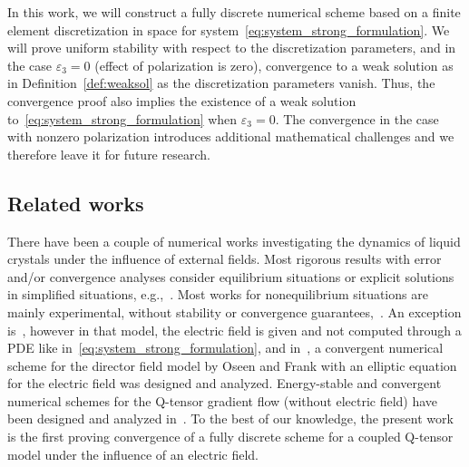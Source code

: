\documentclass[10pt,letterpaper]{amsart}
\theoremstyle{definition}{\newtheorem{definition}[lemma]{Definition}}
\theoremstyle{note}{\newtheorem{claim}{Claim}[section]
\newtheorem*{claim*}{Claim}}
\numberwithin{equation}{section}
\begin{document}
In this work, we will construct a fully discrete numerical scheme based on a finite element discretization in space for system~\eqref{eq:system_strong_formulation}. We will prove uniform stability with respect to the discretization parameters, and in the case $\varepsilon_3=0$ (effect of polarization is zero), convergence to a weak solution as in Definition~\ref{def:weaksol} as the discretization parameters vanish. Thus, the convergence proof also implies the existence of a weak solution to~\eqref{eq:system_strong_formulation} when $\varepsilon_3=0$. The convergence in the case with nonzero polarization introduces additional mathematical challenges and we therefore leave it for future research. 

\subsection{Related works}
There have been a couple of numerical works investigating the dynamics of liquid crystals under the influence of external fields. Most rigorous results with error and/or convergence analyses consider equilibrium situations or explicit solutions in simplified situations, e.g.,~\cite{Nochetto2018,Berezin1973,Davis1998,Helfrich1973,Zhou2015,Borthagaray2021}. Most works for nonequilibrium situations are mainly experimental, without stability or convergence guarantees,~\cite{Aursand2016,Tovkach2017,MacDonald2020,Lee2002,Mori1999,Luckhurst2003}.
An exception is~\cite{Schimming2021}, however in that model, the electric field is given and not computed through a PDE like in~\eqref{eq:system_strong_formulation}, and in~\cite{weber2021convergent}, a convergent numerical scheme for the director field model by Oseen and Frank with an elliptic equation for the electric field was designed and analyzed.
Energy-stable and convergent numerical schemes for the Q-tensor gradient flow (without electric field) have been designed and analyzed in~\cite{Zhao2016,Shen2019,Cai2017,gudibanda_weber_yue_2022,Yue2023}. To the best of our knowledge, the present work is the first proving convergence of a fully discrete scheme for a coupled Q-tensor model under the influence of an electric field.
\end{document}
